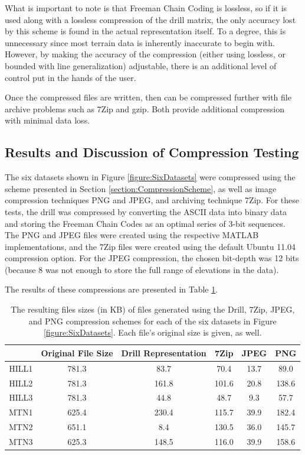 What is important to note is that Freeman Chain Coding is lossless, so if it is used along with a lossless compression of the drill matrix, the only accuracy lost by this scheme is found in the actual representation itself. To a degree, this is unnecessary since most terrain data is inherently inaccurate to begin with. However, by making the accuracy of the compression (either using lossless, or bounded with line generalization) adjustable, there is an additional level of control put in the hands of the user.

Once the compressed files are written, then can be compressed further with file archive problems such as 7Zip \cite{7z-Pavlov} and gzip. Both provide additional compression with minimal data loss.

\subsection{Results and Discussion of Compression Testing}

The six datasets shown in Figure \ref{figure:SixDatasets} were compressed using the scheme presented in Section \ref{section:CompressionScheme}, as well as image compression techniques PNG and JPEG, and archiving technique 7Zip.
For these tests, the drill was compressed by converting the ASCII data into binary data and storing the Freeman Chain Codes as an optimal series of 3-bit sequences.
The PNG and JPEG files were created using the respective MATLAB implementations, and the 7Zip files were created using the default Ubuntu 11.04 compression option. For the JPEG compression, the chosen bit-depth was 12 bits (because 8 was not enough to store the full range of elevations in the data).

The results of these compressions are presented in Table \ref{table:CompressionResults}.

\begin{table}[t]
  \centering
  \begin{tabular}{ | c | c | c | c | c | c |}
    \hline
      & \textbf{Original File Size} & \textbf{Drill Representation} & \textbf{7Zip} & \textbf{JPEG} & \textbf{PNG} \\
    \hline
    HILL1 & 781.3 	& 83.7	& 70.4	& 13.7	& 89.0	\\
    HILL2 & 781.3 	& 161.8 & 101.6	& 20.8	& 138.6	\\
    HILL3 & 781.3 	& 44.8	& 48.7	& 9.3	& 57.7	\\
    MTN1 & 625.4 	& 230.4	& 115.7	& 39.9	& 182.4	\\
    MTN2 & 651.1 	& 8.4	& 130.5	& 36.0	& 145.7	\\
    MTN3 & 625.3 	& 148.5	& 116.0	& 39.9	& 158.6	\\
    \hline
  \end{tabular}
  \caption[Results for compression scheme tests.]{\label{table:CompressionResults} The resulting files sizes (in KB) of files generated using the Drill, 7Zip, JPEG, and PNG compression schemes for each of the six datasets in Figure \ref{figure:SixDatasets}. Each file's original size is given, as well.}
\end{table}

